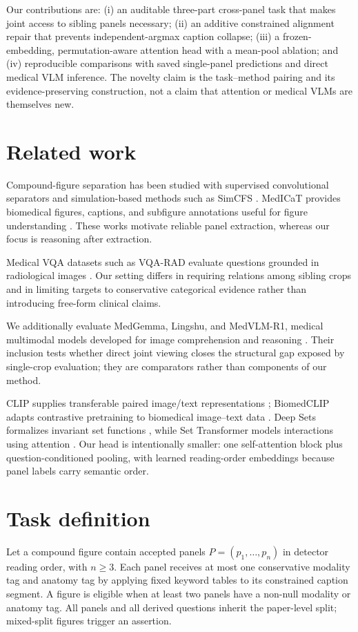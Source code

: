 \documentclass{article}
\begin{document}
Our contributions are: (i) an auditable three-part cross-panel task that makes joint access to sibling panels necessary; (ii) an additive constrained alignment repair that prevents independent-argmax caption collapse; (iii) a frozen-embedding, permutation-aware attention head with a mean-pool ablation; and (iv) reproducible comparisons with saved single-panel predictions and direct medical VLM inference. The novelty claim is the task--method pairing and its evidence-preserving construction, not a claim that attention or medical VLMs are themselves new.

\section{Related work}
Compound-figure separation has been studied with supervised convolutional separators and simulation-based methods such as SimCFS \citep{tsutsui2017compound,yao2022simcfs}. MedICaT provides biomedical figures, captions, and subfigure annotations useful for figure understanding \citep{subramanian2020medicat}. These works motivate reliable panel extraction, whereas our focus is reasoning after extraction.

Medical VQA datasets such as VQA-RAD evaluate questions grounded in radiological images \citep{lau2018vqarad}. Our setting differs in requiring relations among sibling crops and in limiting targets to conservative categorical evidence rather than introducing free-form clinical claims.

We additionally evaluate MedGemma, Lingshu, and MedVLM-R1, medical multimodal models developed for image comprehension and reasoning \citep{google2025medgemma,xu2025lingshu,pan2025medvlmr1}. Their inclusion tests whether direct joint viewing closes the structural gap exposed by single-crop evaluation; they are comparators rather than components of our method.

CLIP supplies transferable paired image/text representations \citep{radford2021clip}; BiomedCLIP adapts contrastive pretraining to biomedical image--text data \citep{zhang2023biomedclip}. Deep Sets formalizes invariant set functions \citep{zaheer2017deepsets}, while Set Transformer models interactions using attention \citep{lee2019settransformer}. Our head is intentionally smaller: one self-attention block plus question-conditioned pooling, with learned reading-order embeddings because panel labels carry semantic order.

\section{Task definition}
Let a compound figure contain accepted panels $P=(p_1,\ldots,p_n)$ in detector reading order, with $n\geq3$. Each panel receives at most one conservative modality tag and anatomy tag by applying fixed keyword tables to its constrained caption segment. A figure is eligible when at least two panels have a non-null modality or anatomy tag. All panels and all derived questions inherit the paper-level split; mixed-split figures trigger an assertion.
\end{document}
